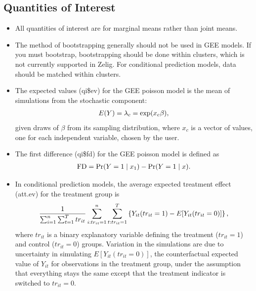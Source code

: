 \documentclass[letterpaper,10pt,english]{sphinxmanual}
\begin{document}
\subsection{Quantities of Interest}
\label{vignette:id137}\begin{itemize}
\item {} 
All quantities of interest are for marginal means rather than joint
means.

\item {} 
The method of bootstrapping generally should not be used in GEE
models. If you must bootstrap, bootstrapping should be done within
clusters, which is not currently supported in Zelig. For conditional
prediction models, data should be matched within clusters.

\item {} 
The expected values (qi\$ev) for the GEE poisson model is the mean of
simulations from the stochastic component:
\begin{gather}
\begin{split}E(Y) =
  \lambda_{c} = \mathrm{exp}(x_{c} \beta),\end{split}\notag
\end{gather}
given draws of \(\beta\) from its sampling distribution, where
\(x_{c}\) is a vector of values, one for each independent
variable, chosen by the user.

\item {} 
The first difference (qi\$fd) for the GEE poisson model is defined as
\begin{gather}
\begin{split}\textrm{FD} = \Pr(Y = 1 \mid x_1) - \Pr(Y = 1 \mid x).\end{split}\notag
\end{gather}
\item {} 
In conditional prediction models, the average expected treatment
effect (att.ev) for the treatment group is
\begin{gather}
\begin{split}\frac{1}{\sum_{i=1}^n \sum_{t=1}^T tr_{it}}\sum_{i:tr_{it}=1}^n \sum_{t:tr_{it}=1}^T \left\{ Y_{it}(tr_{it}=1) -
      E[Y_{it}(tr_{it}=0)] \right\},\end{split}\notag
\end{gather}
where \(tr_{it}\) is a binary explanatory variable defining the
treatment (\(tr_{it}=1\)) and control (\(tr_{it}=0\)) groups.
Variation in the simulations are due to uncertainty in simulating
\(E[Y_{it}(tr_{it}=0)]\), the counterfactual expected value of
\(Y_{it}\) for observations in the treatment group, under the
assumption that everything stays the same except that the treatment
indicator is switched to \(tr_{it}=0\).

\end{itemize}
\end{document}
